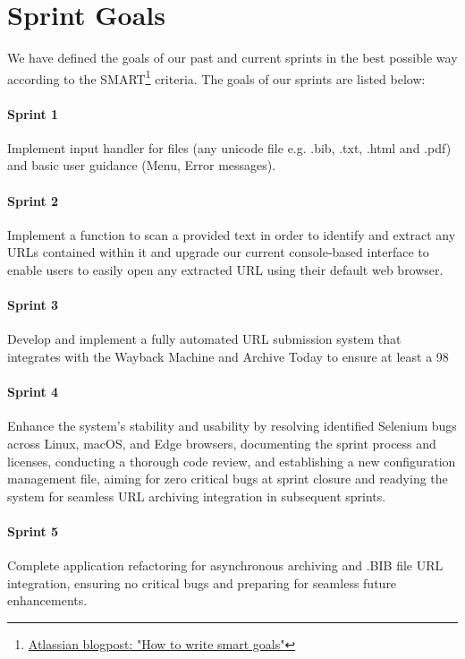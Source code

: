\section{Sprint Goals}
We have defined the goals of our past and current sprints in the best possible way according to the SMART\footnote{\href{https://www.atlassian.com/blog/productivity/how-to-write-smart-goals}{Atlassian blogpost: "How to write smart goals"}} criteria. The goals of our sprints are listed below:

\paragraph{Sprint 1}
Implement input handler for files (any unicode file e.g. .bib, .txt, .html and .pdf) and basic user guidance (Menu, Error messages).

\paragraph{Sprint 2}
Implement a function to scan a provided text in order to identify and extract any URLs contained within it and upgrade our current console-based interface to enable users to easily open any extracted URL using their default web browser.

\paragraph{Sprint 3}
Develop and implement a fully automated URL submission system that integrates with the Wayback Machine and Archive Today to ensure at least a 98%

\paragraph{Sprint 4}
Enhance the system's stability and usability by resolving identified Selenium bugs across Linux, macOS, and Edge browsers, documenting the sprint process and licenses, conducting a thorough code review, and establishing a new configuration management file, aiming for zero critical bugs at sprint closure and readying the system for seamless URL archiving integration in subsequent sprints.

\paragraph{Sprint 5}
Complete application refactoring for asynchronous archiving and .BIB file URL integration, ensuring no critical bugs and preparing for seamless future enhancements.

